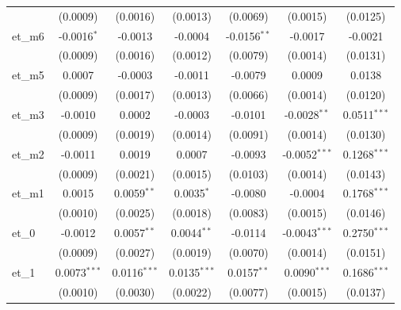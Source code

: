 \begin{tabular}{lcccccc}
                      & (0.0009)         & (0.0016)             & (0.0013)              & (0.0069)        & (0.0015)        & (0.0125)\\   
   et\_m6             & -0.0016$^{*}$    & -0.0013              & -0.0004               & -0.0156$^{**}$  & -0.0017         & -0.0021\\   
                      & (0.0009)         & (0.0016)             & (0.0012)              & (0.0079)        & (0.0014)        & (0.0131)\\   
   et\_m5             & 0.0007           & -0.0003              & -0.0011               & -0.0079         & 0.0009          & 0.0138\\   
                      & (0.0009)         & (0.0017)             & (0.0013)              & (0.0066)        & (0.0014)        & (0.0120)\\   
   et\_m3             & -0.0010          & 0.0002               & -0.0003               & -0.0101         & -0.0028$^{**}$  & 0.0511$^{***}$\\   
                      & (0.0009)         & (0.0019)             & (0.0014)              & (0.0091)        & (0.0014)        & (0.0130)\\   
   et\_m2             & -0.0011          & 0.0019               & 0.0007                & -0.0093         & -0.0052$^{***}$ & 0.1268$^{***}$\\   
                      & (0.0009)         & (0.0021)             & (0.0015)              & (0.0103)        & (0.0014)        & (0.0143)\\   
   et\_m1             & 0.0015           & 0.0059$^{**}$        & 0.0035$^{*}$          & -0.0080         & -0.0004         & 0.1768$^{***}$\\   
                      & (0.0010)         & (0.0025)             & (0.0018)              & (0.0083)        & (0.0015)        & (0.0146)\\   
   et\_0              & -0.0012          & 0.0057$^{**}$        & 0.0044$^{**}$         & -0.0114         & -0.0043$^{***}$ & 0.2750$^{***}$\\   
                      & (0.0009)         & (0.0027)             & (0.0019)              & (0.0070)        & (0.0014)        & (0.0151)\\   
   et\_1              & 0.0073$^{***}$   & 0.0116$^{***}$       & 0.0135$^{***}$        & 0.0157$^{**}$   & 0.0090$^{***}$  & 0.1686$^{***}$\\   
                      & (0.0010)         & (0.0030)             & (0.0022)              & (0.0077)        & (0.0015)        & (0.0137)\\   

\end{tabular}

